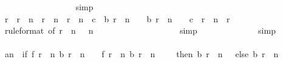 \begin{isabellebody}
\ \ \ \ \ \ \ \ \ \ \ \ \ \ \ \ \isamarkupfalse%
\ simp\isanewline
\ \ \ \ \ \ \ \ \ \ \ \ \ \ \isamarkupfalse%
\ \isamarkupfalse%
\ {\isachardoublequoteopen}r{}\ {\isasymle}\ r{}\ {\isacharplus}\ n\ {\isasymand}\ r{}\ {\isacharplus}\ n\ {\isasymle}\ r{}\ {\isacharplus}\ n\ {\isasymand}\ c{}\ {\isasymle}\ b\ {\isacharparenleft}r{}\ {\isacharplus}\ n\ {\isacharminus}\ {}{\isacharparenright}\ {\isasymand}\ b\ {\isacharparenleft}r{}\ {\isacharplus}\ n\ {\isacharminus}\ {}{\isacharparenright}\ {\isacharless}\ c{}\ {\isacharplus}\ {\isacharparenleft}r{}\ {\isacharplus}\ n\ {\isacharminus}\ r{}{\isacharparenright}{\isachardoublequoteclose}\isanewline
\ \ \ \ \ \ \ \ \ \ \ \ \ \ \ \ \isamarkupfalse%
\ {\isacharasterisk}{\isacharparenleft}{}{\isacharparenright}{\isacharbrackleft}rule{\isacharunderscore}format{\isacharcomma}\ of\ {\isachardoublequoteopen}r{}\ {\isacharplus}\ n\ {\isacharminus}\ {}{\isachardoublequoteclose}{\isacharbrackright}\ {\isacharbackquoteopen}n\ {\isachargreater}\ {}{\isacharbackquoteclose}\isanewline
\ \ \ \ \ \ \ \ \ \ \ \ \ \ \ \ \isamarkupfalse%
\ simp\isanewline
\ \ \ \ \ \ \ \ \ \ \ \ \isamarkupfalse%
\ simp\isanewline
\ \ \ \ \ \ \ \ \ \ \isamarkupfalse%
\isanewline
\isanewline
\ \ \ \ \ \ \ \ \ \ \isamarkupfalse%
\ {\isacharquery}an\ {\isacharequal}\ {\isachardoublequoteopen}if\ f\ {\isacharparenleft}r{}\ {\isacharplus}\ n{\isacharparenright}\ {\isacharparenleft}b\ {\isacharparenleft}r{}\ {\isacharplus}\ n\ {\isacharminus}\ {}{\isacharparenright}{\isacharparenright}\ {\isacharless}\ f\ {\isacharparenleft}r{}\ {\isacharplus}\ n{\isacharparenright}\ {\isacharparenleft}b\ {\isacharparenleft}r{}\ {\isacharplus}\ n\ {\isacharminus}\ {}{\isacharparenright}\ {\isacharplus}\ {}{\isacharparenright}\ then\ b\ {\isacharparenleft}r{}\ {\isacharplus}\ n\ {\isacharminus}\ {}{\isacharparenright}\ else\ b\ {\isacharparenleft}r{}\ {\isacharplus}\ n\ {\isacharminus}\ {}{\isacharparenright}\ {\isacharplus}\ {}{\isachardoublequoteclose}\isanewline
\ \ \ \ \ \ \ \ \ \ \isamarkupfalse%

\end{isabellebody}
